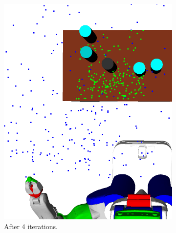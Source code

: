 \begin{figure}
\begin{subfigure}[b]{0.48\linewidth}
    \includegraphics[width=\textwidth]{images/learn4.png}
    \caption{After 4 iterations.}
  \end{subfigure}
  \begin{subfigure}[b]{0.48\linewidth}

\end{subfigure}
\end{figure}
